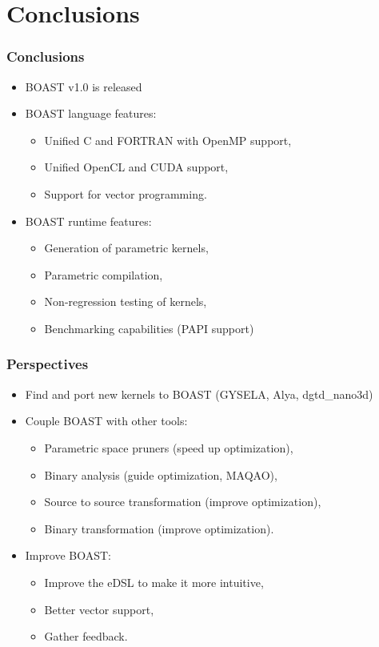 \documentclass{beamer}
\begin{document}
\section{Conclusions}

\begin{frame}
  \frametitle{Conclusions}
  \begin{itemize}
    \item BOAST v1.0 is released
    \item BOAST language features:
    \begin{itemize}
      \item Unified C and FORTRAN with OpenMP support,
      \item Unified OpenCL and CUDA support,
      \item Support for vector programming.
    \end{itemize}
    \item BOAST runtime features:
    \begin{itemize}
      \item Generation of parametric kernels,
      \item Parametric compilation,
      \item Non-regression testing of kernels,
      \item Benchmarking capabilities (PAPI support)
    \end{itemize}
  \end{itemize}
\end{frame}

\begin{frame}
  \frametitle{Perspectives}
  \begin{itemize}
    \item Find and port new kernels to BOAST (GYSELA, Alya, dgtd\_nano3d)
    \item Couple BOAST with other tools:
    \begin{itemize}
      \item Parametric space pruners (speed up optimization),
      \item Binary analysis (guide optimization, MAQAO),
      \item Source to source transformation (improve optimization),
      \item Binary transformation (improve optimization).
    \end{itemize}
    \item Improve BOAST:
    \begin{itemize}
      \item Improve the eDSL to make it more intuitive,
      \item Better vector support,
      \item Gather feedback.
    \end{itemize}
  \end{itemize}
\end{frame}
\end{document}
